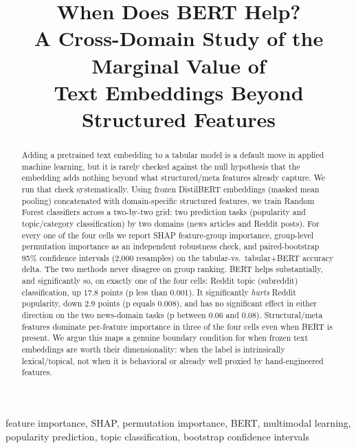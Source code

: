 \documentclass[conference]{IEEEtran}
\begin{document}
\title{When Does BERT Help?\\
A Cross-Domain Study of the Marginal Value of\\
Text Embeddings Beyond Structured Features}

\author{
}

\maketitle

\begin{abstract}
Adding a pretrained text embedding to a tabular model is a default move in applied machine learning, but it is rarely checked against the null hypothesis that the embedding adds nothing beyond what structured/meta features already capture. We run that check systematically. Using frozen DistilBERT embeddings (masked mean pooling) concatenated with domain-specific structured features, we train Random Forest classifiers across a two-by-two grid: two prediction tasks (popularity and topic/category classification) by two domains (news articles and Reddit posts). For every one of the four cells we report SHAP feature-group importance, group-level permutation importance as an independent robustness check, and paired-bootstrap 95\% confidence intervals (2,000 resamples) on the tabular-vs.\ tabular+BERT accuracy delta. The two methods never disagree on group ranking. BERT helps substantially, and significantly so, on exactly one of the four cells: Reddit topic (subreddit) classification, up 17.8 points (p less than 0.001). It significantly \emph{hurts} Reddit popularity, down 2.9 points (p equals 0.008), and has no significant effect in either direction on the two news-domain tasks (p between 0.06 and 0.08). Structural/meta features dominate per-feature importance in three of the four cells even when BERT is present. We argue this maps a genuine boundary condition for when frozen text embeddings are worth their dimensionality: when the label is intrinsically lexical/topical, not when it is behavioral or already well proxied by hand-engineered features.
\end{abstract}

\begin{IEEEkeywords}
feature importance, SHAP, permutation importance, BERT, multimodal learning, popularity prediction, topic classification, bootstrap confidence intervals
\end{IEEEkeywords}
\end{document}
